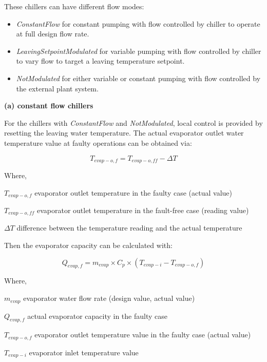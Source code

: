 These chillers can have different flow modes:

\begin{itemize}
\tightlist
\item
  \emph{ConstantFlow} for constant pumping with flow controlled by chiller to operate at full design flow rate.
\item
  \emph{LeavingSetpointModulated} for variable pumping with flow controlled by chiller to vary flow to target a leaving temperature setpoint.
\item
  \emph{NotModulated} for either variable or constant pumping with flow controlled by the external plant system.
\end{itemize}

\newline \newline

\textbf{(a) constant flow chillers}

For the chillers with \emph{ConstantFlow} and \emph{NotModulated}, local control is provided by resetting the leaving water temperature. The actual evaporator outlet water temperature value at faulty operations can be obtained via:

\begin{equation}
T_{evap-o,f} = T_{evap-o,ff} - \Delta T
\end{equation}

Where, 

\(T_{evap-o,f}\) evaporator outlet temperature in the faulty case (actual value)

\(T_{evap-o,ff}\) evaporator outlet temperature in the fault-free case (reading value)

\(\Delta T\) difference between the temperature reading and the actual temperature

Then the evaporator capacity can be calculated with:

\begin{equation}
Q_{evap,f} = m_{evap} \times C_p \times (T_{evap-i} - T_{evap-o,f} )
\end{equation}

Where, 

\(m_{evap}\) evaporator water flow rate (design value, actual value)

\(Q_{evap,f}\) actual evaporator capacity in the faulty case

\(T_{evap-o,f}\) evaporator outlet temperature value in the faulty case (actual value)

\(T_{evap-i}\) evaporator inlet temperature value 

